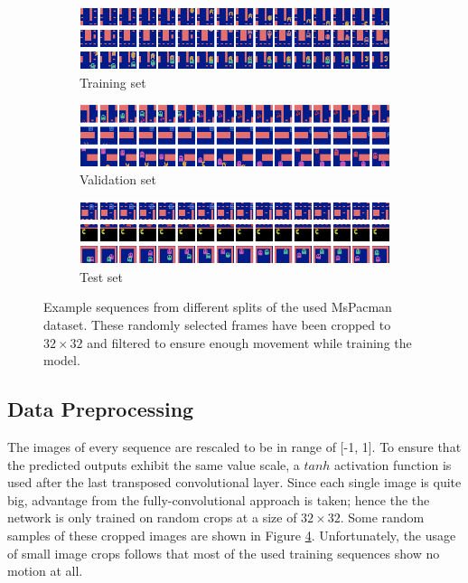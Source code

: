 \begin{figure}[htb]
\centering
\begin{subfigure}{1.0\textwidth}
  \centering
  \includegraphics[width=1.0\linewidth]{figures/ds/pac_train.png}
  \caption{Training set}
  \label{fig:pac_train}
  \vspace{.1cm}
\end{subfigure}
\begin{subfigure}{1.0\textwidth}
  \centering
  \includegraphics[width=1.0\linewidth]{figures/ds/pac_valid.png}
  \caption{Validation set}
  \label{fig:pac_valid}
  \vspace{.1cm}
\end{subfigure}
\begin{subfigure}{1.0\textwidth}
  \centering
  \includegraphics[width=1.0\linewidth]{figures/ds/pac_test.png}
  \caption{Test set}
  \label{fig:pac_test}
\end{subfigure}
\caption[MsPacman Crop Image Samples]{Example sequences from different splits of the used MsPacman dataset. These randomly selected frames have been cropped to $32 \times 32 $ and filtered to ensure enough movement while training the model.}
\label{fig:pacman}
\end{figure}


\subsection{Data Preprocessing} \label{sec:pacman_preprocessing}

The images of every sequence are rescaled to be in range of [-1, 1]. To ensure that the predicted outputs exhibit the same value scale, a $tanh$ activation function is used after the last transposed convolutional layer. Since each single image is quite big, advantage from the fully-convolutional approach is taken; hence the the network is only trained on random crops at a size of $ 32 \times 32 $. Some random samples of these cropped images are shown in Figure \ref{fig:pacman}. Unfortunately, the usage of small image crops follows that most of the used training sequences show no motion at all.

